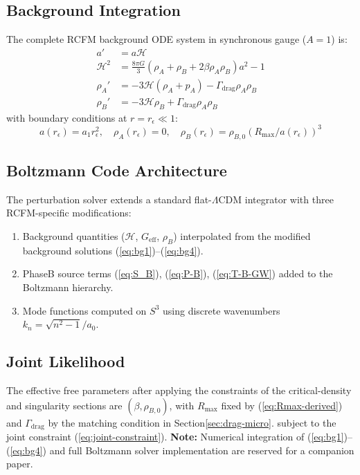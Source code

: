\documentclass[10pt,twocolumn]{article}
\theoremstyle{definition}
\newcommand{\Rmax}{R_{\max}}
\newcommand{\rhoA}{\rho_{A}}
\newcommand{\rhoB}{\rho_{B}}
\newcommand{\Hcal}{\mathcal{H}}
\newcommand{\Geff}{G_{\mathrm{eff}}}
\newcommand{\Gammadrag}{\Gamma_{\mathrm{drag}}}
\begin{document}
\subsection{Background Integration}

The complete RCFM background ODE system in synchronous
gauge (\( A=1 \)) is:
\begin{align}
  a'  &= a\Hcal\label{eq:bg1}\\
  \Hcal^{2}
      &= \frac{8\pi G}{3}(\rhoA+\rhoB+2\beta\rhoA\rhoB)a^{2}-1
         \label{eq:bg2}\\
  \rhoA'
      &= -3\Hcal(\rhoA+p_{A})-\Gammadrag\rhoA\rhoB
         \label{eq:bg3}\\
  \rhoB'
      &= -3\Hcal\rhoB+\Gammadrag\rhoA\rhoB
         \label{eq:bg4}
\end{align}
with boundary conditions at \( r=r_{\epsilon}\ll1 \):
\begin{equation}
  a(r_{\epsilon}) = a_{1}r_{\epsilon}^{2},
  \quad
  \rhoA(r_{\epsilon}) = 0,
  \quad
  \rhoB(r_{\epsilon})
    = \rho_{B,0}(\Rmax/a(r_{\epsilon}))^{3}
\end{equation}

\subsection{Boltzmann Code Architecture}

The perturbation solver extends a standard flat-$\Lambda$CDM
integrator with three RCFM-specific modifications:
\begin{enumerate}[label=(\roman*)]
  \item Background quantities (\( \Hcal \), \( \Geff \),
    \( \rhoB \)) interpolated from the modified background
    solutions (\ref{eq:bg1})--(\ref{eq:bg4}).
  \item Phase\nobreakspace{}B source terms
    (\ref{eq:S_B}), (\ref{eq:P-B}), (\ref{eq:T-B-GW})
    added to the Boltzmann hierarchy.
  \item Mode functions computed on \( S^{3} \) using
    discrete wavenumbers \( k_{n}=\sqrt{n^{2}-1}/a_{0} \).
\end{enumerate}



\subsection{Joint Likelihood}

The effective free parameters after applying the
constraints of the critical-density and singularity sections
are \( (\beta,\rho_{B,0}) \),
with \( \Rmax \) fixed by (\ref{eq:Rmax-derived}) and
\( \Gammadrag \) by the matching condition in Section\~\ref{sec:drag-micro}.
subject to the joint constraint (\ref{eq:joint-constraint}).
\noindent
\textbf{Note:} Numerical integration of
(\ref{eq:bg1})--(\ref{eq:bg4}) and full Boltzmann
solver implementation are reserved for a companion paper.
\end{document}
